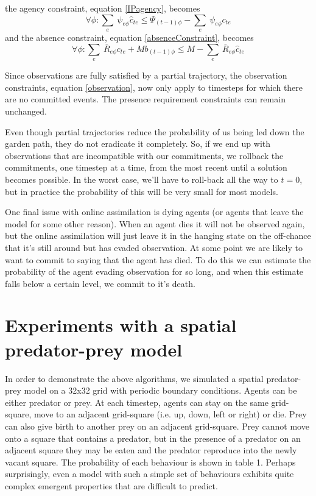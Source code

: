 \documentclass{article}
\begin{document}
the agency constraint, equation \ref{IPagency}, becomes
\begin{equation}
\forall\phi:  \sum_e\ \psi_{e\phi}\hat{c}_{te} \le \Psi_{(t-1)\phi}  -  \sum_e\ \psi_{e\phi} c_{te}
\end{equation}
and the absence constraint, equation \ref{absenceConstraint}, becomes
\begin{equation}
\forall\phi: \sum_e\ \bar{R}_{e\phi} c_{te} + Mb_{(t-1)\phi} \le M - \sum_e\ \bar{R}_{e\phi} \hat{c}_{te}
\end{equation}

Since observations are fully satisfied by a partial trajectory, the observation constraints, equation \ref{observation}, now only apply to timesteps for which there are no committed events. The presence requirement constraints can remain unchanged.

Even though partial trajectories reduce the probability of us being led down the garden path, they do not eradicate it completely. So, if we end up with observations that are incompatible with our commitments, we rollback the commitments, one timestep at a time, from the most recent until a solution becomes possible. In the worst case, we'll have to roll-back all the way to $t=0$, but in practice the probability of this will be very small for most models.

One final issue with online assimilation is dying agents (or agents that leave the model for some other reason). When an agent dies it will not be observed again, but the online assimilation will just leave it in the hanging state on the off-chance that it's still around but has evaded observation. At some point we are likely to want to commit to saying that the agent has died. To do this we can estimate the probability of the agent evading observation for so long, and when this estimate falls below a certain level, we commit to it's death.

\section{Experiments with a spatial predator-prey model}

In order to demonstrate the above algorithms, we simulated a spatial predator-prey model on a 32x32 grid with periodic boundary conditions. Agents can be either predator or prey. At each timestep, agents can stay on the same grid-square, move to an adjacent grid-square (i.e. up, down, left or right) or die. Prey can also give birth to another prey on an adjacent grid-square. Prey cannot move onto a square that contains a predator, but in the presence of a predator on an adjacent square they may be eaten and the predator reproduce into the newly vacant square. The probability of each behaviour is shown in table 1. Perhaps surprisingly, even a model with such a simple set of behaviours exhibits quite complex emergent properties that are difficult to predict.
\end{document}
